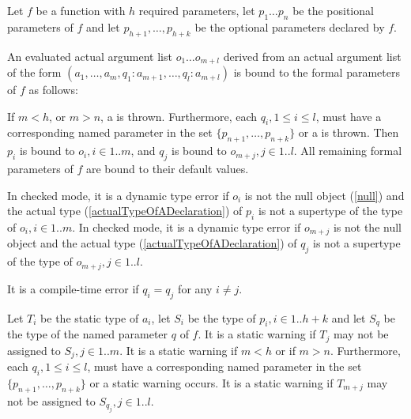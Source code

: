 \documentclass{article}
\begin{document}
\LMHash{}
Let $f$ be a function with $h$ required parameters,  let $p_1 \ldots p_n$ be the positional parameters of $f$ and let $p_{h+1}, \ldots, p_{h+k}$ be the optional parameters declared by $f$.

\LMHash{}
An evaluated actual argument list $o_1 \ldots o_{m+l}$ derived from an actual argument list of the form $(a_1, \ldots, a_m, q_1: a_{m+1}, \ldots, q_l: a_{m+l})$ is bound to the formal parameters of $f$ as follows:




\LMHash{}
If  $m < h$, or $m > n$, a  is thrown. Furthermore, each $q_i, 1 \le i \le l$,  must have a corresponding named parameter in the set $\{p_{n+1}, \ldots, p_{n +k}\}$ or a  is thrown. Then $p_i$ is bound to $o_i, i \in 1.. m$, and $q_j$  is bound to $o_{m+j}, j \in 1.. l$.  All remaining formal parameters of $f$  are bound to their default values.


\LMHash{}
In checked mode, it is a dynamic type error if  $o_i$ is not the null object (\ref{null}) and the actual type  (\ref{actualTypeOfADeclaration}) of $p_i$ is not a supertype of the type of $o_i, i \in 1.. m$. In checked mode, it is a dynamic type error if  $o_{m+j}$ is not the null object and the actual type  (\ref{actualTypeOfADeclaration}) of $q_j$ is not a supertype of the type of $o_{m+j}, j \in 1.. l$.

\LMHash{}
It is a compile-time error if $q_i = q_j$ for any $i \ne j$.

\LMHash{}
Let $T_i$ be the static type of $a_i$, let $S_i$ be the type of $p_i, i \in 1 .. h+k$ and let $S_q$ be the type of the named parameter $q$ of $f$.  It is a static warning if $T_j$ may not be assigned to $S_j, j \in 1..m$.  It is a static warning if $m < h$ or if $m > n$. Furthermore, each $q_i, 1 \le i \le l$,  must have a corresponding named parameter in the set $\{p_{n+1}, \ldots, p_{n +k}\}$ or a static warning occurs.  It is a static warning if $T_{m+j}$ may not be assigned to $S_{q_j}, j \in 1 .. l$.
\end{document}
